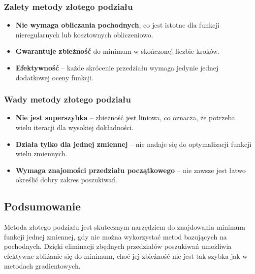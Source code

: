 \subsubsection{Zalety metody złotego podziału}
\begin{itemize}
    \item \textbf{Nie wymaga obliczania pochodnych}, co jest istotne dla funkcji nieregularnych lub kosztownych obliczeniowo.
    \item \textbf{Gwarantuje zbieżność} do minimum w skończonej liczbie kroków.
    \item \textbf{Efektywność} – każde skrócenie przedziału wymaga jedynie jednej dodatkowej oceny funkcji.
\end{itemize}

\subsubsection{Wady metody złotego podziału}
\begin{itemize}
    \item \textbf{Nie jest superszybka} – zbieżność jest liniowa, co oznacza, że potrzeba wielu iteracji dla wysokiej dokładności.
    \item \textbf{Działa tylko dla jednej zmiennej} – nie nadaje się do optymalizacji funkcji wielu zmiennych.
    \item \textbf{Wymaga znajomości przedziału początkowego} – nie zawsze jest łatwo określić dobry zakres poszukiwań.
\end{itemize}

\subsection{Podsumowanie}
Metoda złotego podziału jest skutecznym narzędziem do znajdowania minimum funkcji jednej zmiennej, gdy nie można wykorzystać metod bazujących na pochodnych. Dzięki eliminacji zbędnych przedziałów poszukiwań umożliwia efektywne zbliżanie się do minimum, choć jej zbieżność nie jest tak szybka jak w metodach gradientowych.
